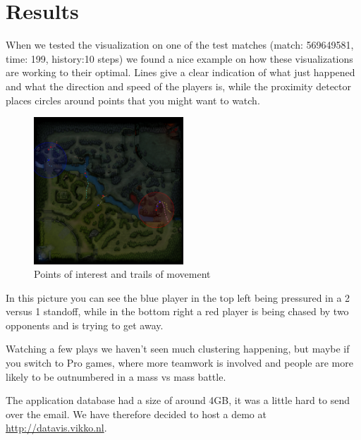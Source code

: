\documentclass[a4paper]{article}
\theoremstyle{plain} %
\theoremstyle{definition} %
\begin{document}
\section*{Results}
When we tested the visualization on one of the test matches (match: 569649581, time: 199, history:10 steps) we found a nice example on how these visualizations are working to their optimal. Lines give a clear indication of what just happened and what the direction and speed of the players is, while the proximity detector places circles around points that you might want to watch.
\begin{figure}[h!]
 	\centering
    	\includegraphics[width=0.5\textwidth]{proximity}
\caption*{Points of interest and trails of movement}
\end{figure}

In this picture you can see the blue player in the top left being pressured in a 2 versus 1 standoff, while in the bottom right a red player is being chased by two opponents and is trying to get away.

Watching a few plays we haven't seen much clustering happening, but maybe if you switch to Pro games, where more teamwork is involved and people are more likely to be outnumbered in a mass vs mass battle.

The application database had a size of around 4GB, it was a little hard to send over the email. We have therefore decided to host a demo at \url{http://datavis.vikko.nl}.
\end{document}
